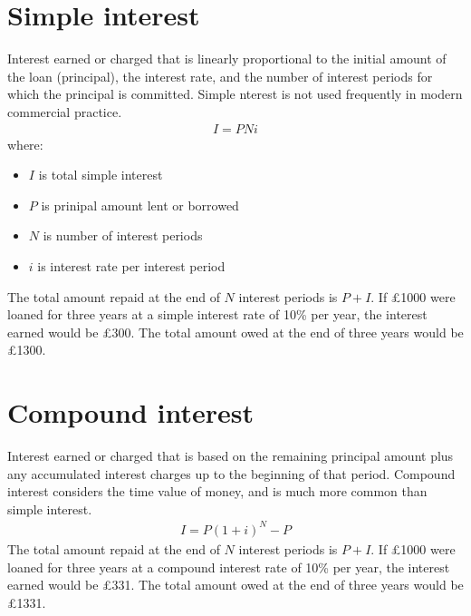 \documentclass[class=report, crop=false, 12pt,a4paper]{standalone}
\begin{document}
\section{Simple interest}
Interest earned or charged that is linearly proportional to the initial amount of the loan (principal), the interest rate, and the number of interest periods for which the principal is committed. Simple nterest is not used frequently in modern commercial practice.
\begin{gather}
	I = PNi
\end{gather}
where:
\begin{itemize}
	\item $I$ is total simple interest
	\item $P$ is prinipal amount lent or borrowed
	\item $N$ is number of interest periods
	\item $i$ is interest rate per interest period
\end{itemize}
The total amount repaid at the end of $N$ interest periods is $P+I$. If £1000 were loaned for three years at a simple interest rate of 10\% per year, the interest earned would be £300. The total amount owed at the end of three years would be £1300.
\section{Compound interest}
Interest earned or charged that is based on the remaining principal amount plus any accumulated interest charges up to the beginning of that period. Compound interest considers the time value of money, and is much more common than simple interest.
\begin{gather}
	I = P\left(1 + i\right)^N - P
\end{gather} 
The total amount repaid at the end of $N$ interest periods is $P+I$. If £1000 were loaned for three years at a compound interest rate of 10\% per year, the interest earned would be £331. The total amount owed at the end of three years would be £1331. 
\end{document}
